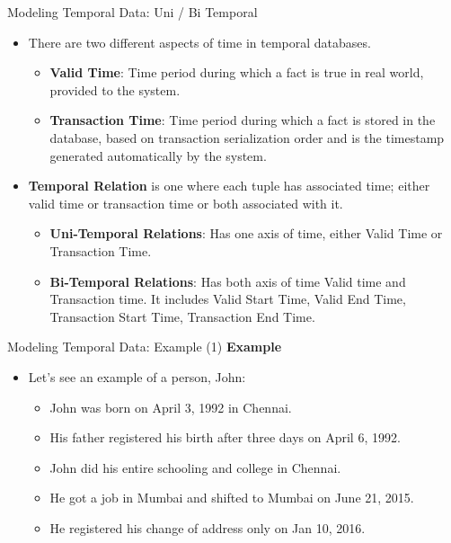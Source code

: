 \documentclass[aspectratio=169, xcolor=dvipsnames]{beamer}
\begin{document}
\begin{frame}{Modeling Temporal Data: Uni / Bi Temporal}
    \begin{itemize}[<+->]
        \item There are two different aspects of time in temporal databases.
        \begin{itemize}
            \item[$\triangleright$] \textbf{Valid Time}: Time period during which a fact is true in real world, provided to the system.
            \item[$\triangleright$] \textbf{Transaction Time}: Time period during which a fact is stored in the database, based on transaction serialization order and is the timestamp generated automatically by the system.
        \end{itemize}
        \item \textbf{Temporal Relation} is one where each tuple has associated time; either valid time or transaction time or both associated with it.
        \begin{itemize}
            \item[$\triangleright$] \textbf{Uni-Temporal Relations}: Has one axis of time, either Valid Time or Transaction Time.
            \item[$\triangleright$] \textbf{Bi-Temporal Relations}: Has both axis of time Valid time and Transaction time. It includes Valid Start Time, Valid End Time, Transaction Start Time, Transaction End Time.
        \end{itemize}
    \end{itemize}
\end{frame}

\begin{frame}{Modeling Temporal Data: Example (1)}
    \textbf{Example}
    \begin{itemize}[<+->]
        \item Let's see an example of a person, John:
        \begin{itemize}
            \item[$\triangleright$] John was born on April 3, 1992 in Chennai.
            \item[$\triangleright$] His father registered his birth after three days on April 6, 1992.
            \item[$\triangleright$] John did his entire schooling and college in Chennai.
            \item[$\triangleright$] He got a job in Mumbai and shifted to Mumbai on June 21, 2015.
            \item[$\triangleright$] He registered his change of address only on Jan 10, 2016.
        \end{itemize}
    \end{itemize}
\end{frame}
\end{document}
